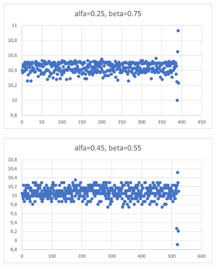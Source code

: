 \documentclass[12pt]{mwart}
\begin{document}
	\begin{figure}[H]
		\centering
		\includegraphics{10_a0.25.png}
	\end{figure}
	\begin{figure}[H]
		\centering
		\includegraphics{10_a0.45.png}
	\end{figure}
\end{document}

